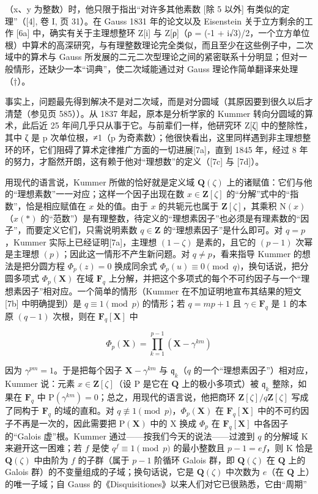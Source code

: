（x、y 为整数）时，他只限于指出“对许多其他素数 {[}除 5 以外{]} 有类似的定理”（{[}4{]}, 卷 I, 页 31）。在 Gauss 1831 年的论文以及 Eisenstein 关于立方剩余的工作 {[}6a{]} 中，确实有关于主理想整环 Z{[}i{]} 与 Z{[}ρ{]}（ρ = (-1 + i√3)/2，一个立方单位根）中算术的高深研究，与有理整数理论完全类似，而且至少在这些例子中，二次域中的算术与 Gauss 所发展的二元二次型理论之间的紧密联系十分明显；但对一般情形，还缺少一本“词典”，使二次域能通过对 Gauss 理论作简单翻译来处理（†）。

事实上，问题最先得到解决不是对二次域，而是对分圆域（其原因要到很久以后才清楚（参见页 585））。从 1837 年起，原本是分析学家的 Kummer 转向分圆域的算术，此后近 25 年间几乎只从事于它。与前辈们一样，他研究环 Z{[}ζ{]} 中的整除性，其中 ζ 是 p 次单位根，≠1（p 为奇素数）；他很快看出，这里同样遇到非主理想整环的环，它们阻碍了算术定律推广方面的一切进展{[}7a{]}，直到 1845 年，经过 8 年的努力，才豁然开朗，这有赖于他对“理想数”的定义（{[}7c{]} 与 {[}7d{]}）。

用现代的语言说，Kummer 所做的恰好就是定义域 \(\mathbf{Q}(\zeta)\) 上的诸赋值：它们与他的“理想素数”一一对应；这样一个因子出现在数 \(x \in \mathbf{Z}[\zeta]\) 的“分解”式中的“指数”，恰是相应赋值在 \(x\) 处的值。由于 \(x\) 的共轭元也属于 \(\mathbf{Z}[\zeta]\)，其乘积 \(\mathrm{N}(x)\)（\(x(*)\) 的“范数”）是有理整数，待定义的“理想素因子”也必须是有理素数的“因子”，而要定义它们，只需说明素数 \(q \in \mathbf{Z}\) 的“理想素因子”是什么即可。对 \(q = p\)，Kummer 实际上已经证明{[}7a{]}，主理想 \((1 - \zeta)\) 是素的，且它的 \((p - 1)\) 次幂是主理想 \((p)\)；因此这一情形不产生新问题。对 \(q \neq p\)，看来指导 Kummer 的想法是把分圆方程 \(\Phi_p(z) = 0\) 换成同余式 \(\Phi_p(u) \equiv 0 \pmod{q}\)，换句话说，把分圆多项式 \(\Phi_p(\mathbf{X})\) 在域 \(\mathbf{F}_q\) 上分解，并把这个多项式的每个不可约因子与一个“理想素因子”相对应。一个简单的情形（Kummer 在不加证明地宣布其结果的短文 {[}7b{]} 中明确提到）是 \(q \equiv 1 \pmod{p}\) 的情形；若 \(q = mp + 1\) 且 \(\gamma \in \mathbf{F}_q\) 是 1 的本原 \((q - 1)\) 次根，则在 \(\mathbf{F}_q[\mathbf{X}]\) 中

\[
\Phi_ {p} (\mathbf {X}) = \prod_ {k = 1} ^ {p - 1} \left(\mathbf {X} - \gamma^ {k m}\right)
\]

因为 \(\gamma^{pm} = 1\)。于是把每个因子 \(\mathbf{X} - \gamma^{km}\) 与 \(\mathfrak{q}_k\)（\(q\) 的一个“理想素因子”）相对应，Kummer 说：元素 \(x \in \mathbf{Z}[\zeta]\)（设 P 是它在 \(\mathbf{Q}\) 上的极小多项式）被 \(\mathfrak{q}_k\) 整除，如果在 \(\mathbf{F}_q\) 中 \(\mathrm{P}(\gamma^{km}) = 0\)；总之，用现代的语言说，他把商环 \(\mathbf{Z}[\zeta]/q\mathbf{Z}[\zeta]\) 写成了同构于 \(\mathbf{F}_q\) 的域的直和。对 \(q \not\equiv 1 \pmod{p}\)，\(\Phi_p(\mathbf{X})\) 在 \(\mathbf{F}_q[\mathbf{X}]\) 中的不可约因子不再是一次的，因此需要把 \(\mathrm{P}(\mathbf{X})\) 中的 X 换成 \(\Phi_p\) 在 \(\mathbf{F}_q[\mathbf{X}]\) 中各因子的“Galois 虚”根。Kummer 通过——按我们今天的说法——过渡到 \(q\) 的分解域 K 来避开这一困难；若 \(f\) 是使 \(q^f \equiv 1 \pmod{p}\) 的最小整数且 \(p - 1 = ef\)，则 K 恰是 \(\mathbf{Q}(\zeta)\) 中由阶为 \(f\) 的子群（属于 \(p - 1\) 阶循环 Galois 群，即 \(\mathbf{Q}(\zeta)\) 在 \(\mathbf{Q}\) 上的 Galois 群）的不变量组成的子域；换句话说，它是 \(\mathbf{Q}(\zeta)\) 中次数为 \(e\)（在 \(\mathbf{Q}\) 上）的唯一子域；自 Gauss 的《Disquisitiones》以来人们对它已很熟悉，它由“周期”

